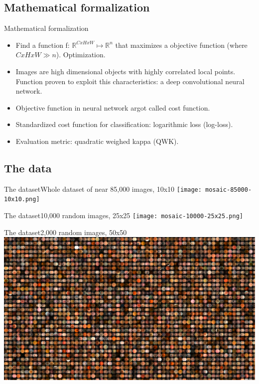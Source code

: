 \documentclass{beamer}
\begin{document}
\subsection{Mathematical formalization}
\begin{frame}{Mathematical formalization}
  \begin{itemize}
  \item {   
    Find a function f: $\mathbb{R}^{CxHxW} 
    \mapsto \mathbb{R}^{n}$ that maximizes a objective function (where $CxHxW \gg n$). \alert{Optimization}.
  }
  \item {
  	Images are high dimensional objects with highly correlated local points.
    Function proven to exploit this characteristics: a \alert{deep convolutional neural network}.
  }
  \item {
    \alert{Objective function} in neural network argot called \alert{cost function}.
  }
  \item {
    Standardized cost function for classification: \alert{logarithmic loss} (log-loss).
  }
  \item {
  	Evaluation metric: \alert{quadratic weighed kappa} (QWK).
  }
  \end{itemize}
\end{frame}

\subsection{The data}

\begin{frame}{The dataset}{Whole dataset of near 85,000 images, 10x10}
	\texttt{[image: mosaic-85000-10x10.png]}	
\end{frame}

\begin{frame}{The dataset}{10,000 random images, 25x25}
	\texttt{[image: mosaic-10000-25x25.png]}	
\end{frame}

\begin{frame}{The dataset}{2,000 random images, 50x50}
	\includegraphics[width=1.0\textwidth]{mosaic-2000-50x50.png}	
\end{frame}
\end{document}
